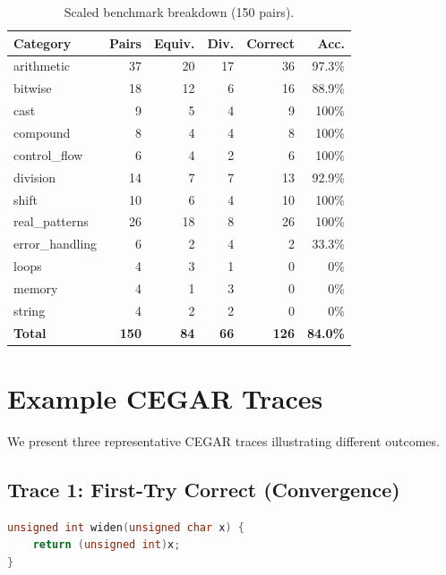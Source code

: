 \documentclass[11pt]{article}
\begin{document}
\begin{table}[H]
\centering
\caption{Scaled benchmark breakdown (150 pairs).}\label{tab:scaled150}
\begin{tabular}{@{}lrrrrr@{}}
\toprule
\textbf{Category} & \textbf{Pairs} & \textbf{Equiv.} & \textbf{Div.} &
\textbf{Correct} & \textbf{Acc.} \\
\midrule
arithmetic       & 37  & 20 & 17 & 36 & 97.3\% \\
bitwise          & 18  & 12 &  6 & 16 & 88.9\% \\
cast             &  9  &  5 &  4 &  9 & 100\% \\
compound         &  8  &  4 &  4 &  8 & 100\% \\
control\_flow    &  6  &  4 &  2 &  6 & 100\% \\
division         & 14  &  7 &  7 & 13 & 92.9\% \\
shift            & 10  &  6 &  4 & 10 & 100\% \\
real\_patterns   & 26  & 18 &  8 & 26 & 100\% \\
error\_handling  &  6  &  2 &  4 &  2 & 33.3\% \\
loops            &  4  &  3 &  1 &  0 & 0\% \\
memory           &  4  &  1 &  3 &  0 & 0\% \\
string           &  4  &  2 &  2 &  0 & 0\% \\
\midrule
\textbf{Total}   & \textbf{150} & \textbf{84} & \textbf{66} &
\textbf{126} & \textbf{84.0\%} \\
\bottomrule
\end{tabular}
\end{table}

\section{Example CEGAR Traces}\label{app:cegar-traces}

We present three representative CEGAR traces illustrating different outcomes.

\subsection{Trace 1: First-Try Correct (Convergence)}

\begin{lstlisting}[language=C,caption={C source: \texttt{cast\_u8\_to\_u32}.}]
unsigned int widen(unsigned char x) {
    return (unsigned int)x;
}
\end{lstlisting}
\end{document}
